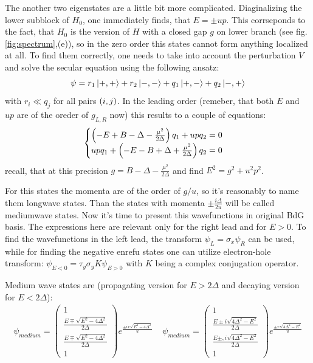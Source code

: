 The another two eigenstates are a little bit more complicated. Diaginalizing  the lower subblock of $ H_0 $, one immediately finds, that $ E=\pm up $. This corrseponds to the fact, that $ H_0 $ is the version of $ H $ with a closed gap $ g $  on lower branch (see fig. \ref{fig:spectrum},(e)), so in the zero order this states cannot form anything localized at all. To find them correctly, one needs to take into account the perturbation $ V $ and solve the secular equation using the following ansatz:
\begin{gather}
	\psi = r_1\ket{+, + }+r_2\ket{-, - }+q_{1}\ket{+, - }+q_{2}\ket{-, + }
\end{gather}
with $ r_i\ll q_j $ for all  pairs $ \left(i,j\right) $. In the leading order (remeber, that both $ E  $ and $ up $ are of the oreder of $ g_{L,R} $ now) this results to a couple of equations:
\begin{gather}
\begin{cases}
	\left(-E+B-\Delta-\frac{\mu^2}{2\Delta}\right)q_1+up q_2=0
	\\
	u p q_1 + \left(-E-B+\Delta+\frac{\mu^2}{2\Delta}\right)q_2 =0
\end{cases}
\end{gather}
recall, that at this precision $ g=B-\Delta-\frac{\mu^2}{2\Delta} $ and find $ E^2=g^2+u^2p^2 $.

For this states the momenta are of the order of $ g/u $, so it's reasonably to name them longwave states. Than the states with momenta $ \pm\frac{i\Delta}{2u} $ will be called mediumwave states.
Now it's time to present this wavefunctions in original BdG basis. The expressions here are relevant only for the right lead and for $ E>0 $. To find the wavefunctions in the left lead, the transform $ \psi_L=\sigma_x\psi_R $ can be used, while for finding the negative enrefu states one can utilize electron-hole transform: $ \psi_{E<0}= \tau_y\sigma_yK\psi_{E>0}$ with $ K $ being a complex conjugation operator.

Medium wave states are (propagating version for $ E>2\Delta $ and decaying version for $ E<2\Delta $):
\begin{gather}
	\psi_{medium}=
	\begin{pmatrix}
	1
	\\
	\frac{E\mp\sqrt{E^2-4\Delta^2}}{2\Delta}
	\\
	\frac{E\mp\sqrt{E^2-4\Delta^2}}{2\Delta}
	\\
	1
	\end{pmatrix}
	e^\frac{\pm i x\sqrt{E^2-4\Delta^2}}{u}
	~~~~~
	\psi_{medium}=
	\begin{pmatrix}
	1
	\\
	\frac{E\pm i\sqrt{4\Delta^2-E^2}}{2\Delta}
	\\
	\frac{E\pm, i\sqrt{4\Delta^2-E^2}}{2\Delta}
	\\
	1
	\end{pmatrix}
	e^\frac{\pm  x\sqrt{4\Delta^2-E^2}}{u}
\end{gather}

